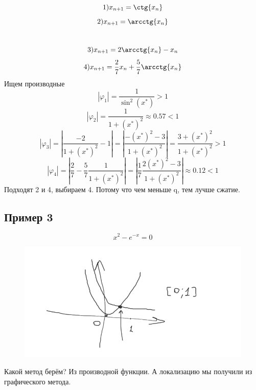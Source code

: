 \documentclass[a4paper,12pt]{article}
\begin{document}
\[1) x_{n+1} = \ctg{x_n}\]
\[2) x_{n+1} = \arcctg{x_n}\]\
\[3) x_{n+1} = 2\arcctg{x_n} - x_n\]
\[4) x_{n+1} = \frac{2}{7}x_n + \frac{5}{7}\arcctg{x_n}\]
Ищем производные\\
\[|\varphi_1| = \frac{1}{\sin^2{(x^*)}} > 1\]
\[|\varphi_2| = \frac{1}{1 + (x^*)^2} \approx 0.57 < 1\]
\[|\varphi_3| = |\frac{-2}{1+(x^*)^2} - 1| = |\frac{-(x^*)^2 - 3}{1 + (x^*)^2}| = \frac{3 + (x^*)^2}{1 + (x^*)^2} > 1 \]
\[|\varphi_4| = |\frac{2}{7} - \frac{5}{7}\frac{1}{1+(x^*)^2}| = |\frac{1}{7}\frac{2(x^*)^2 - 3}{1 + (x^*)^2}| \approx 0.12 < 1\]
Подходят 2 и 4, выбираем 4. Потому что чем меньше q, тем лучше сжатие.

\subsection*{Пример 3}
\[x^2 - e^{-x} = 0\]
        \begin{figure}[h!]
            \centering
            \includegraphics[width=12cm]{5SemPic1.png}
            \label{fig:vac}
        \end{figure}
        
        Какой метод берём?
        Из производной функции. А локализацию мы получили из графического метода.
\end{document}
